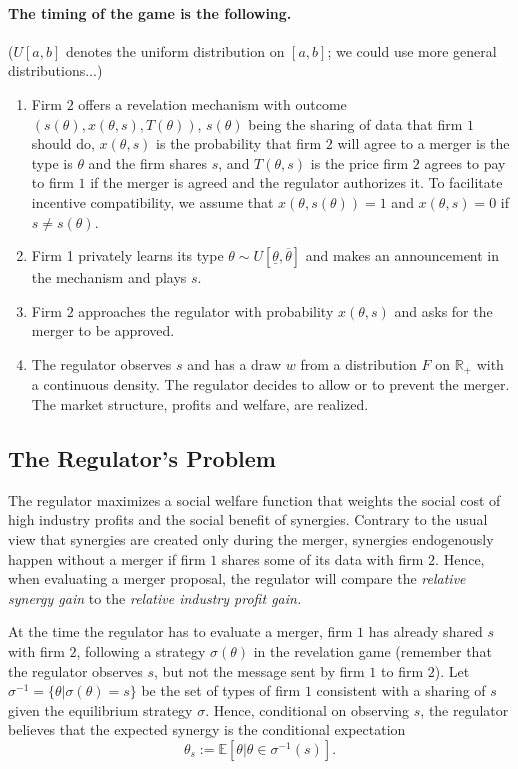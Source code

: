\documentclass[a4paper]{article}
\newcommand{\E}{\mathbb E}
\renewcommand{\t}{\theta}
\begin{document}
\paragraph{The timing of the game is the following.} ($U[a,b]$ denotes the uniform distribution on $[a,b]$; we could use more general distributions...)
\begin{enumerate}\setlength\itemsep{0em}
    \item Firm $2$ offers a revelation mechanism with outcome $(s(\t),x(\t,s),T(\t))$, $s(\t)$ being the sharing of data that firm $1$ should do, $x(\t,s)$ is the probability that firm $2$ will agree to a merger is the type is $\t$ and the firm shares $s$, and $T(\t,s)$ is the price firm $2$ agrees to pay to firm $1$ if the merger is agreed and the regulator authorizes it. To facilitate incentive compatibility, we assume that $x(\t,s(\t))=1$ and $x(\t,s)=0$ if $s\neq s(\t)$.
    \item Firm 1 privately learns its type $\t\sim U[\underline{\t},\overline{\t}]$ and makes an announcement in the mechanism and plays $s$.
    \item Firm $2$ approaches the regulator with probability $x(\t,s)$ and asks for the merger to be approved.
    \item The regulator observes $s$ and has a draw $w$ from a distribution $F$ on $\mathbb R_+$ with a continuous density. The regulator decides to allow or to prevent the merger. The market structure, profits and welfare, are realized.
\end{enumerate}
%
\subsection{The Regulator's Problem}
   The regulator maximizes a social welfare function that weights the social cost of high industry profits and the social benefit of synergies. Contrary to the usual view that synergies are created only during the merger, synergies endogenously happen without a merger if firm $1$ shares some of its data with firm $2$. Hence, when evaluating a merger proposal, the regulator will compare the \emph{relative synergy gain} to the \emph{relative industry profit gain.}

   At the time the regulator has to evaluate a merger, firm $1$ has already shared $s$ with firm $2$, following a strategy $\sigma(\t)$ in the revelation game (remember that the regulator observes $s$, but not the message sent by firm $1$ to firm $2$).  Let $\sigma^{-1}=\{\t|\sigma(\t)=s\}$ be the set of types of firm $1$ consistent with a sharing of $s$ given the equilibrium strategy $\sigma$. Hence, conditional on observing $s$, the regulator believes that the expected synergy is the conditional expectation $$\t_s:=\E[\t|\t\in\sigma^{-1}(s)].$$
     
\end{document}

